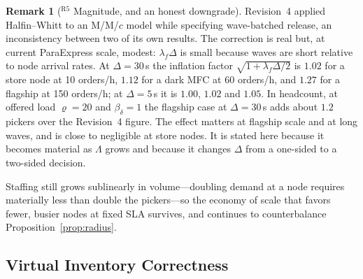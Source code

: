 \documentclass[10pt,twocolumn,letterpaper]{article}
\theoremstyle{definition}
\newtheorem{remark}{Remark}
\begin{document}
\begin{remark}[$^{\mathrm{R5}}$ Magnitude, and an honest downgrade]
Revision~4 applied Halfin--Whitt to an M/M/$c$ model while specifying wave-batched release, an inconsistency between two of its own results. The correction is real but, at current ParaExpress scale, modest: $\lambda_f\Delta$ is small because waves are short relative to node arrival rates. At $\Delta=30$\,s the inflation factor $\sqrt{1+\lambda_f\Delta/2}$ is $1.02$ for a store node at 10 orders/h, $1.12$ for a dark MFC at 60 orders/h, and $1.27$ for a flagship at 150 orders/h; at $\Delta=5$\,s it is $1.00$, $1.02$ and $1.05$. In headcount, at offered load $\varrho=20$ and $\beta_\delta=1$ the flagship case at $\Delta=30$\,s adds about $1.2$ pickers over the Revision~4 figure. The effect matters at flagship scale and at long waves, and is close to negligible at store nodes. It is stated here because it becomes material as $\Lambda$ grows and because it changes $\Delta$ from a one-sided to a two-sided decision.

Staffing still grows sublinearly in volume---doubling demand at a node requires materially less than double the pickers---so the economy of scale that favors fewer, busier nodes at fixed SLA survives, and continues to counterbalance Proposition~\ref{prop:radius}.
\end{remark}

\subsection{Virtual Inventory Correctness}
\end{document}

